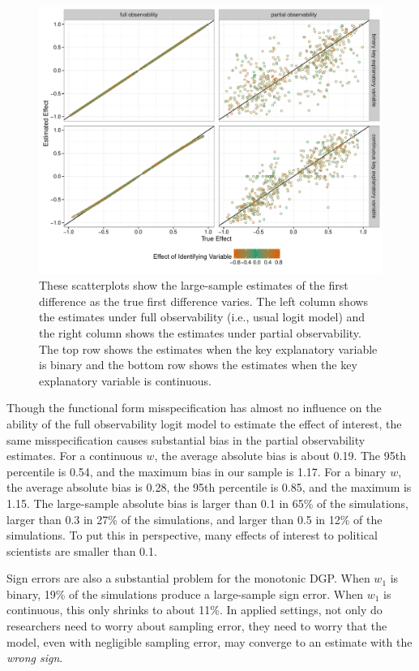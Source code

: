 \documentclass[10pt]{article}
\begin{document}
\begin{figure}[H]
\begin{center}
\includegraphics[scale = 0.6]{figs/mon-sims-scatter.pdf}
\caption{These scatterplots show the large-sample estimates of the first difference as the true first difference varies. The left column shows the estimates under full observability (i.e., usual logit model) and the right column shows the estimates under partial observability. The top row shows the estimates when the key explanatory variable is binary and the bottom row shows the estimates when the key explanatory variable is continuous.}\label{fig:mon-sims}
\end{center}
\end{figure}

Though the functional form misspecification has almost no influence on the ability of the full observability logit model to estimate the effect of interest, the same misspecification causes substantial bias in the partial observability estimates. 
For a continuous $w$, the average absolute bias is about 0.19. The 95th percentile is 0.54, and the maximum bias in our sample is 1.17. 
For a binary $w$, the average absolute bias is 0.28, the 95th percentile is 0.85, and the maximum is 1.15. 
The large-sample absolute bias is larger than 0.1 in 65\% of the simulations, larger than 0.3 in 27\% of the simulations, and larger than 0.5 in 12\% of the simulations. 
To put this in perspective, many effects of interest to political scientists are smaller than 0.1. 

Sign errors are also a substantial problem for the monotonic DGP. 
When $w_1$ is binary, 19\% of the simulations produce a large-sample sign error. 
When $w_1$ is continuous, this only shrinks to about 11\%. 
In applied settings, not only do researchers need to worry about sampling error, they need to worry that the model, even with negligible sampling error, may converge to an estimate with the \textit{wrong sign}.
\end{document}
